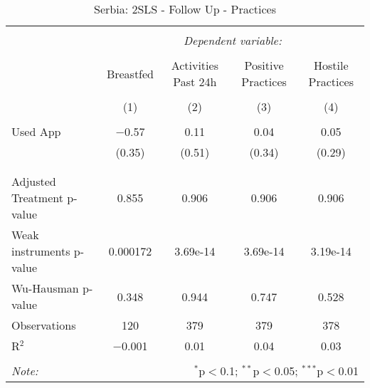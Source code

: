 
\begin{table}[!htbp] \centering 
  \caption{Serbia: 2SLS - Follow Up - Practices} 
  \label{tbl:Serbia: 2SLS - Follow Up - Practices} 
\begin{tabular}{@{\extracolsep{5pt}}lcccc} 
\\[-1.8ex]\hline 
\hline \\[-1.8ex] 
 & \multicolumn{4}{c}{\textit{Dependent variable:}} \\ 
\cline{2-5} 
\\[-1.8ex] & Breastfed & Activities Past 24h & Positive Practices & Hostile Practices \\ 
\\[-1.8ex] & (1) & (2) & (3) & (4)\\ 
\hline \\[-1.8ex] 
 Used App & $-$0.57 & 0.11 & 0.04 & 0.05 \\ 
  & (0.35) & (0.51) & (0.34) & (0.29) \\ 
  & & & & \\ 
\hline \\[-1.8ex] 
Adjusted Treatment p-value & 0.855 & 0.906 & 0.906 & 0.906 \\ 
Weak instruments p-value & 0.000172 & 3.69e-14 & 3.69e-14 & 3.19e-14 \\ 
Wu-Hausman p-value & 0.348 & 0.944 & 0.747 & 0.528 \\ 
Observations & 120 & 379 & 379 & 378 \\ 
R$^{2}$ & $-$0.001 & 0.01 & 0.04 & 0.03 \\ 
\hline 
\hline \\[-1.8ex] 
\textit{Note:}  & \multicolumn{4}{r}{$^{*}$p$<$0.1; $^{**}$p$<$0.05; $^{***}$p$<$0.01} \\ 
\end{tabular} 
\end{table} 
